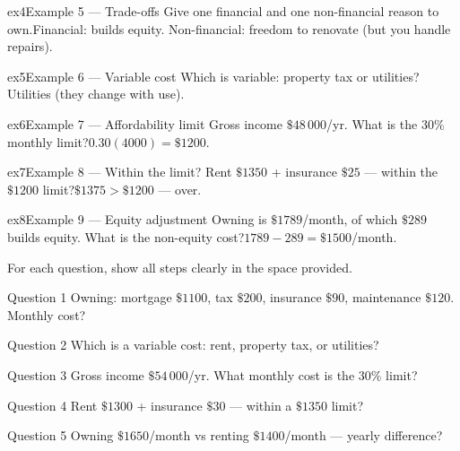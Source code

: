 \documentclass[11pt]{article}
\begin{document}
\begin{example}{ex4}{Example 5 --- Trade-offs}
Give one financial and one non-financial reason to own.\soln Financial: builds equity. Non-financial: freedom to renovate (but you handle repairs).
\end{example}

\begin{example}{ex5}{Example 6 --- Variable cost}
Which is variable: property tax or utilities?\soln Utilities (they change with use).
\end{example}

\begin{example}{ex6}{Example 7 --- Affordability limit}
Gross income $\$48\,000$/yr. What is the $30\%$ monthly limit?\soln $0.30(4000)=\$1200$.
\end{example}

\begin{example}{ex7}{Example 8 --- Within the limit?}
Rent $\$1350$ + insurance $\$25$ — within the $\$1200$ limit?\soln $\$1375>\$1200$ — over.
\end{example}

\begin{example}{ex8}{Example 9 --- Equity adjustment}
Owning is $\$1789$/month, of which $\$289$ builds equity. What is the non-equity cost?\soln $1789-289=\$1500$/month.
\end{example}

\clearpage
{}
For each question, show all steps clearly in the space provided.

\begin{qbox}{Question 1}
Owning: mortgage $\$1100$, tax $\$200$, insurance $\$90$, maintenance $\$120$. Monthly cost?\workspace{2.4cm}
\end{qbox}

\begin{qbox}{Question 2}
Which is a variable cost: rent, property tax, or utilities?\workspace{2.4cm}
\end{qbox}

\begin{qbox}{Question 3}
Gross income $\$54\,000$/yr. What monthly cost is the $30\%$ limit?\workspace{2.4cm}
\end{qbox}

\begin{qbox}{Question 4}
Rent $\$1300$ + insurance $\$30$ — within a $\$1350$ limit?\workspace{2.4cm}
\end{qbox}

\begin{qbox}{Question 5}
Owning $\$1650$/month vs renting $\$1400$/month — yearly difference?\workspace{2.4cm}
\end{qbox}
\end{document}
